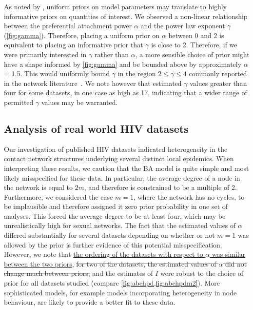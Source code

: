 \documentclass[12pt]{article}\usepackage[]{graphicx}\usepackage[]{color}
\let\mref\cref
\renewcommand{\cref}[1]{\mbox{\mref{#1}}}
\newcommand{\add}[1]{\color{blue} \uline{#1} \color{black}}
\newcommand{\del}[1]{\color{red} \sout{#1} \color{black}}
\begin{document}
As noted by \textcite{lintusaari2016identifiability}, uniform priors on model
parameters may translate to highly informative priors on quantities of
interest. We observed a non-linear relationship between the preferential
attachment power $\alpha$ and the power law exponent $\gamma$
(\cref{fig:gamma}). Therefore, placing a uniform prior on $\alpha$ between 0
and 2 is equivalent to placing an informative prior that $\gamma$ is close to
2. Therefore, if we were primarily interested in $\gamma$ rather than
$\alpha$, a more sensible choice of prior might have a shape informed by
\cref{fig:gamma} and be bounded above by approximately $\alpha$ = 1.5. This
would uniformly bound $\gamma$ in the region $2 \leq \gamma \leq 4$ commonly
reported in the network literature~\autocite{liljeros2001web,
schneeberger2004scale, colgate1989risk, brown2011transmission}. We note however
that \textcite{jones2003assessment} estimated $\gamma$ values greater than
four for some datasets, in one case as high as 17, indicating that a wider
range of permitted $\gamma$ values may be warranted.

\subsection*{Analysis of real world HIV datasets}

Our investigation of published HIV datasets indicated heterogeneity in the
contact network structures underlying several distinct local epidemics. When
interpreting these results, we caution that the BA model is quite simple and
most likely misspecified for these data. In particular, the average degree of a
node in the network is equal to $2m$, and therefore is constrained to be a
multiple of 2. Furthermore, we considered the case $m = 1$, where the network
has no cycles, to be implausible and therefore assigned it zero prior
probability in one set of analyses. This forced the average degree to be at
least four, which may be unrealistically high for sexual networks. The fact
that the estimated values of $\alpha$ differed substantially for several datasets
depending on whether or not $m = 1$ was allowed by the prior is further evidence
of this potential misspecification. However, we note that \add{the ordering of
the datasets with respect to $\alpha$ was similar between the two priors,}
\del{for two of the datasets, the estimated values of $\alpha$ did not change
much between priors,} and the estimates of $I$ were robust to the choice of
prior for all datasets studied (compare \cref{fig:abchpd,fig:abchpdm2}). More
sophisticated models, for example models incorporating heterogeneity in node
behaviour, are likely to provide a better fit to these data.
\end{document}
